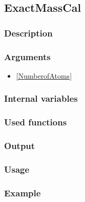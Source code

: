 \subsection{ExactMassCal}\label{ExactMassCal}
\subsubsection{Description}


\subsubsection{Arguments}

\begin{itemize}
\item \ref{NumberofAtoms}
\end{itemize}
\subsubsection{Internal variables}
\subsubsection{Used functions}
\subsubsection{Output}
\subsubsection{Usage}
\subsubsection{Example}




